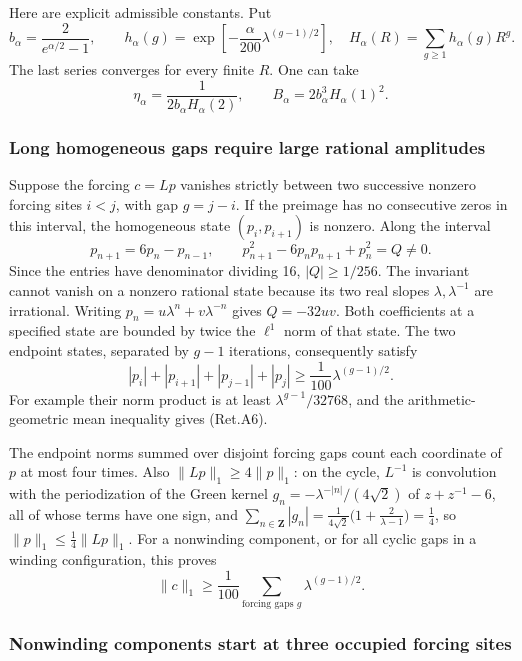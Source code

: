 Here are explicit admissible constants. Put
\[
 b_\alpha=\frac{2}{e^{\alpha/2}-1},\qquad
 h_\alpha(g)=\exp\left[-\frac{\alpha}{200}
                              \lambda^{(g-1)/2}\right],
 \quad H_\alpha(R)=\sum_{g\ge1}h_\alpha(g)R^g.
\]
The last series converges for every finite \(R\). One can take
\[
 \eta_\alpha=\frac1{2b_\alpha H_\alpha(2)},\qquad
 B_\alpha=2b_\alpha^3H_\alpha(1)^2.                         \tag{Ret.A5}
\]

\hypertarget{long-homogeneous-gaps-require-large-rational-amplitudes}{%
\subsubsection{Long homogeneous gaps require large rational amplitudes}\label{long-homogeneous-gaps-require-large-rational-amplitudes}}

Suppose the forcing \(c=Lp\) vanishes strictly between two successive
nonzero forcing sites \(i<j\), with gap \(g=j-i\).
If the preimage has no consecutive zeros in this interval,
the homogeneous state \((p_i,p_{i+1})\) is nonzero.
Along the interval
\[
 p_{n+1}=6p_n-p_{n-1},\qquad
 p_{n+1}^2-6p_np_{n+1}+p_n^2=Q\ne0.
\]
Since the entries have denominator dividing 16, \(|Q|\ge1/256\).
The invariant cannot vanish on a nonzero rational state because its
two real slopes \(\lambda,\lambda^{-1}\) are irrational.
Writing \(p_n=u\lambda^n+v\lambda^{-n}\) gives \(Q=-32uv\).
Both coefficients at a specified state are bounded by twice the
\(\ell^1\) norm of that state. The two endpoint states, separated by
\(g-1\) iterations, consequently satisfy
\[
 |p_i|+|p_{i+1}|+|p_{j-1}|+|p_j|
                   \ge\frac1{100}\lambda^{(g-1)/2}.        \tag{Ret.A6}
\]
For example their norm product is at least
\(\lambda^{g-1}/32768\), and the arithmetic-geometric mean inequality
gives (Ret.A6).

The endpoint norms summed over disjoint forcing gaps count each
coordinate of \(p\) at most four times.
Also \(\|Lp\|_1\ge4\|p\|_1\): on the cycle, \(L^{-1}\) is
convolution with the periodization of the Green kernel
\(g_n=-\lambda^{-|n|}/(4\sqrt2)\) of \(z+z^{-1}-6\), all of whose
terms have one sign, and
\(\sum_{n\in\mathbf Z}|g_n|  =\frac1{4\sqrt2}\bigl(1+\frac{2}{\lambda-1}\bigr)=\frac14\),
so \(\|p\|_1\le\frac14\|Lp\|_1\).
For a nonwinding component, or for all cyclic gaps in a winding
configuration, this proves
\[
 \|c\|_1\ge\frac1{100}
                  \sum_{\text{forcing gaps }g}\lambda^{(g-1)/2}. \tag{Ret.A7}
\]

\hypertarget{nonwinding-components-start-at-three-occupied-forcing-sites}{%
\subsubsection{Nonwinding components start at three occupied forcing sites}\label{nonwinding-components-start-at-three-occupied-forcing-sites}}

